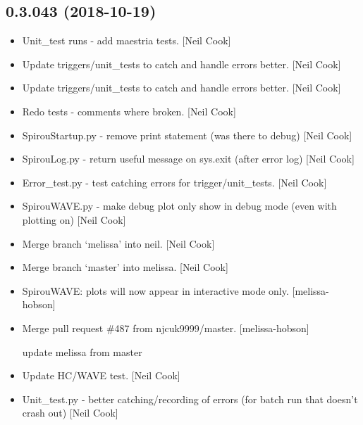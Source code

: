 \documentclass[a4paper,10pt,english]{report}
\begin{document}
\subsection{0.3.043 (2018-10-19)}
\label{\detokenize{misc/changelog:id286}}\begin{itemize}
\item {} 
Unit\_test runs - add maestria tests. {[}Neil Cook{]}

\item {} 
Update triggers/unit\_tests to catch and handle errors better. {[}Neil
Cook{]}

\item {} 
Update triggers/unit\_tests to catch and handle errors better. {[}Neil
Cook{]}

\item {} 
Redo tests - comments where broken. {[}Neil Cook{]}

\item {} 
SpirouStartup.py - remove print statement (was there to debug) {[}Neil
Cook{]}

\item {} 
SpirouLog.py - return useful message on sys.exit (after error log)
{[}Neil Cook{]}

\item {} 
Error\_test.py - test catching errors for trigger/unit\_tests. {[}Neil
Cook{]}

\item {} 
SpirouWAVE.py - make debug plot only show in debug mode (even with
plotting on) {[}Neil Cook{]}

\item {} 
Merge branch ‘melissa’ into neil. {[}Neil Cook{]}

\item {} 
Merge branch ‘master’ into melissa. {[}Neil Cook{]}

\item {} 
SpirouWAVE: plots will now appear in interactive mode only. {[}melissa-
hobson{]}

\item {} 
Merge pull request \#487 from njcuk9999/master. {[}melissa-hobson{]}

update melissa from master

\item {} 
Update HC/WAVE test. {[}Neil Cook{]}

\item {} 
Unit\_test.py - better catching/recording of errors (for batch run that
doesn’t crash out) {[}Neil Cook{]}


\end{itemize}
\end{document}
